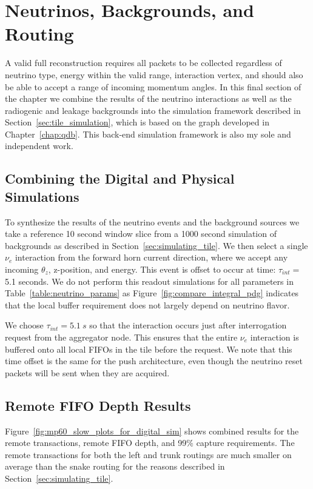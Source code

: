 \section{Neutrinos, Backgrounds, and Routing}
A valid full reconstruction requires all packets to be collected regardless of neutrino type, energy within the valid range, interaction vertex, and should also be able to accept a range of incoming momentum angles.
In this final section of the chapter we combine the results of the neutrino interactions as well as the radiogenic and leakage backgrounds into the simulation framework described in Section~\ref{sec:tile_simulation}, which is based on the graph developed in Chapter~\ref{chap:qdb}.
This back-end simulation framework is also my sole and independent work.

\subsection{Combining the Digital and Physical Simulations}
To synthesize the results of the neutrino events and the background sources we take a reference 10 second window slice from a 1000 second simulation of backgrounds as described in Section~\ref{sec:simulating_tile}.
We then select a single $\nu_{e}$ interaction from the forward horn current direction, where we accept any incoming $\theta_{z}$, z-position, and energy.
This event is offset to occur at time: $\tau_{int} = $5.1 seconds.
We do not perform this readout simulations for all parameters in Table~\ref{table:neutrino_params} as Figure~\ref{fig:compare_integral_pdg} indicates that the local buffer requirement does not largely depend on neutrino flavor.

We choose $\tau_{int} = 5.1~\unit{s}$ so that the interaction occurs just after interrogation request from the aggregator node.
This ensures that the entire $\nu_{e}$ interaction is buffered onto all local FIFOs in the tile before the request. 
We note that this time offset is the same for the push architecture, even though the neutrino reset packets will be sent when they are acquired.

\subsection{Remote FIFO Depth Results}
Figure~\ref{fig:mp60_slow_plots_for_digital_sim} shows combined results for the remote transactions, remote FIFO depth, and 99\% capture requirements.
The remote transactions for both the left and trunk routings are much smaller on average than the snake routing for the reasons described in Section~\ref{sec:simulating_tile}.

